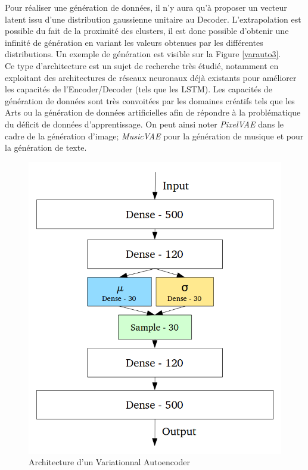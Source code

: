 \noindent Pour réaliser une génération de données, il n'y aura qu'à proposer un vecteur latent issu d'une distribution gaussienne unitaire au Decoder. L'extrapolation est possible du fait de la proximité des clusters, il est donc possible d'obtenir une infinité de génération en variant les valeurs obtenues par les différentes distributions. Un exemple de génération est visible sur la Figure \ref{varauto3}.\\

\noindent Ce type d'architecture est un sujet de recherche très étudié, notamment en exploitant des architectures de réseaux neuronaux déjà existants pour améliorer les capacités de l'Encoder/Decoder (tels que les LSTM). Les capacités de génération de données sont très convoitées par les domaines créatifs tels que les Arts ou la génération de données artificielles afin de répondre à la problématique du déficit de données d'apprentissage. On peut ainsi noter \textit{PixelVAE}\cite{pixelvae} dans le cadre de la génération d'image; \textit{MusicVAE}\cite{musicvae} pour la génération de musique et \cite{textvae1}\cite{textvae2} pour la génération de texte.

\begin{figure}
    \centering
    \includegraphics[scale=0.2]{./tex/encoder-decoder-network/varauto1.png}
    \caption{Architecture d'un Variationnal Autoencoder}
    \label{varauto1}
\end{figure}

